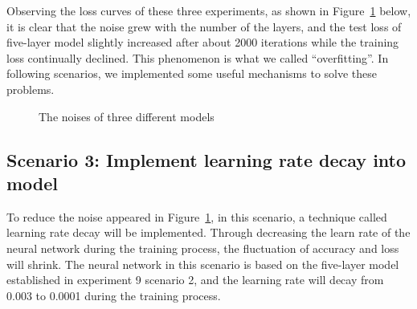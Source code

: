 \documentclass[]{UCD_CS_FYP_Report}
\begin{document}
Observing the loss curves of these three experiments, as shown in Figure~\ref{fig:The noises of three different models} below, it is clear that the noise grew with the number of the layers, and the test loss of five-layer model slightly increased after about 2000 iterations while the training loss continually declined. This phenomenon is what we called “overfitting”. In following scenarios, we implemented some useful mechanisms to solve these problems.
\begin{figure}[h]
\centering
\fboxsep 2mm
\caption{\label{fig:The noises of three different models} The noises of three different models}
\end{figure}
\subsection{Scenario 3: Implement learning rate decay into model}
To reduce the noise appeared in Figure~\ref{fig:The noises of three different models}, in this scenario, a technique called learning rate decay will be implemented. Through decreasing the learn rate of the neural network during the training process, the fluctuation of accuracy and loss will shrink. The neural network in this scenario is based on the five-layer model established in experiment 9 scenario 2, and the learning rate will decay from 0.003 to 0.0001 during the training process. 
\end{document}
